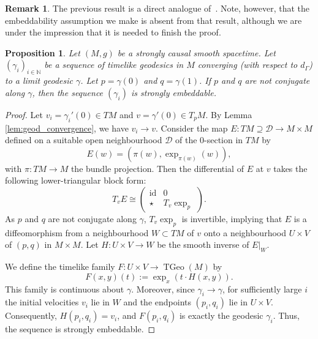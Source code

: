 \documentclass[a4paper,11pt]{article}
\numberwithin{equation}{section}
\theoremstyle{plain}
\newtheorem{Proposition}[Definition]{Proposition}
\theoremstyle{definition}
\newtheorem{Remark}[Definition]{Remark}
\DeclareMathOperator{\TGeo}{TGeo}
\begin{document}
\begin{Remark} The previous result is a direct analogue of~\cite[Lem.\ 3.4]{shankar2009conjugate}. Note, however, that the embeddability assumption we make is absent from that result, although we are under the impression that it is needed to finish the proof.  
\end{Remark}

\begin{Proposition}\label{prop:embeddable_for_spacetimes} Let $(M,g)$ be a strongly causal smooth spacetime. Let $(\gamma_i)_{i\in\mathbb{N}}$ be a sequence of timelike geodesics in $M$ converging (with respect to $d_{\Gamma}$) to a limit geodesic $\gamma$. Let $p = \gamma(0)$ and $q = \gamma(1)$. 
If $p$ and $q$ are not conjugate along $\gamma$, then the sequence $(\gamma_i)$ is strongly embeddable.
\end{Proposition}
\begin{proof} 
Let $v_i = \gamma_i'(0) \in TM$ and $v = \gamma'(0) \in T_pM$. By Lemma \ref{lem:geod_convergence},
we have $v_i \to v$. Consider the map $E: TM \supseteq \mathcal{D} \to M\times M$ defined on
a suitable open neighbourhood $\mathcal{D}$ of the $0$-section in $TM$ by 
\[ E(w) = (\pi(w), \exp_{\pi(w)}(w)), \]
with $\pi: TM \to M$ the bundle projection. Then the differential of $E$ at $v$ takes the following lower-triangular block form:
\[
    T_vE \cong \begin{pmatrix}
    \mathrm{id} & 0 \\
    \star & T_v\exp_p
    \end{pmatrix}.
\]
As $p$ and $q$ are not conjugate along $\gamma$, $T_v\exp_p$ is invertible, implying that $E$ is a diffeomorphism from a neighbourhood $W \subset TM$ of $v$ onto a neighbourhood $U \times V$ of $(p, q)$ in $M\times M$. Let $H: U \times V \to W$ be the smooth inverse of $E|_{W}$.

We define the timelike family $F: U \times V \to \TGeo(M)$ by
\[ F(x, y)(t) := \exp_x(t \cdot H(x, y)). \]
This family is continuous about $\gamma$. Moreover, since $\gamma_i \to \gamma$, for sufficiently large $i$ the initial velocities $v_i$ lie in $W$ and the endpoints $(p_i, q_i)$ lie in $U \times V$. Consequently, $H(p_i, q_i) = v_i$, and $F(p_i, q_i)$ is exactly the geodesic $\gamma_i$. Thus, the sequence is strongly embeddable.
\end{proof}
\end{document}
